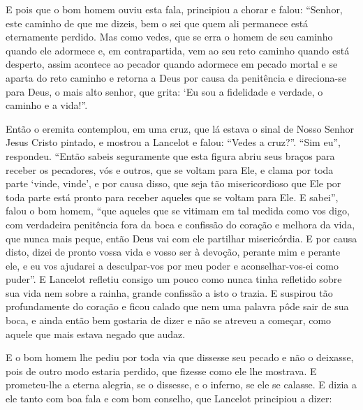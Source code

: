 E pois que o bom homem ouviu esta fala, principiou a chorar e falou: “Senhor,
este caminho de que me dizeis, bem o sei que quem ali permanece está
eternamente perdido. Mas como vedes, que se erra o homem de seu caminho quando
ele adormece e, em contrapartida, vem ao seu reto caminho quando está desperto,
assim acontece ao pecador quando adormece em pecado mortal e se aparta do reto
caminho e retorna a Deus por causa da penitência e direciona-se para Deus, o
mais alto senhor, que grita: ‘Eu sou a fidelidade e verdade, o caminho e a
vida!”. 

Então o eremita contemplou, em uma cruz, que lá estava o sinal de Nosso Senhor
Jesus Cristo pintado, e mostrou a Lancelot e falou: “Vedes a cruz?”. “Sim eu”,
respondeu. “Então sabeis seguramente que esta figura abriu seus braços para
receber os pecadores, vós e outros, que se voltam para Ele, e clama por toda
parte ‘vinde, vinde’, e por causa disso, que seja tão misericordioso que Ele
por toda parte está pronto para receber aqueles que se voltam para Ele. E
sabei”, falou o bom homem, “que aqueles que se vitimam em tal medida como vos
digo, com verdadeira penitência fora da boca e confissão do coração e melhora
da vida, que nunca mais peque, então Deus vai com ele partilhar misericórdia. E
por causa disto, dizei de pronto vossa vida e vosso ser à devoção, perante mim
e perante ele, e eu vos ajudarei a desculpar-vos por meu poder e
aconselhar-vos-ei como puder”. E Lancelot refletiu consigo um pouco
como nunca tinha refletido sobre sua vida nem sobre a rainha, grande confissão
a isto o trazia. E suspirou tão profundamente do coração e ficou
calado que nem uma palavra pôde sair de sua boca, e ainda então bem gostaria de
dizer e não se atreveu a começar, como aquele que mais estava negado que audaz.


E o bom homem lhe pediu por toda via que dissesse seu pecado e não o deixasse,
pois de outro modo estaria perdido, que fizesse como ele lhe mostrava. E
prometeu-lhe a eterna alegria, se o dissesse, e o inferno, se ele se calasse. E
dizia a ele tanto com boa fala e com bom conselho, que Lancelot principiou a
dizer: 

